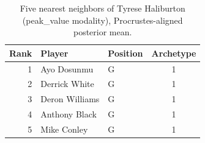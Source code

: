 \begin{table}[htbp]
  \centering\small
  \begin{tabular}{rllc}
    \toprule
    Rank & Player & Position & Archetype \\
    \midrule
    1 & Ayo Dosunmu & G & 1 \\
    2 & Derrick White & G & 1 \\
    3 & Deron Williams & G & 1 \\
    4 & Anthony Black & G & 1 \\
    5 & Mike Conley & G & 1 \\
    \bottomrule
  \end{tabular}
  \caption{Five nearest neighbors of Tyrese Haliburton (peak_value modality), Procrustes-aligned posterior mean.}
  \label{tab:Tyrese_Haliburton_neighbors_peak_value}
\end{table}

